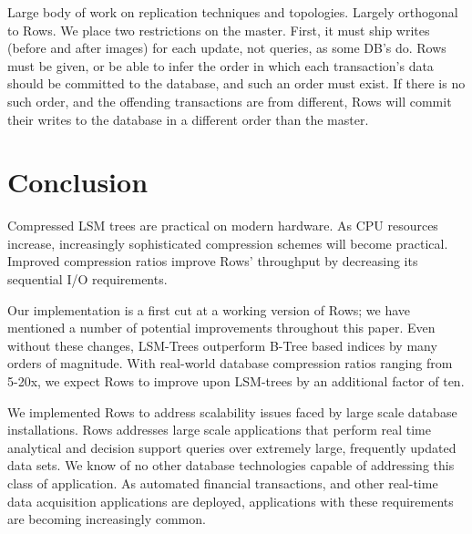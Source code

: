 \documentclass{sig-alternate-sigmod08}
\newcommand{\rows}{Rows\xspace}
\newcommand{\rowss}{Rows'\xspace}
\begin{document}
Large body of work on replication techniques and topologies.  Largely
orthogonal to \rows.  We place two restrictions on the master.  First,
it must ship writes (before and after images) for each update, not
queries, as some DB's do.  \rows must be given, or be able to infer
the order in which each transaction's data should be committed to the
database, and such an order must exist.  If there is no such order,
and the offending transactions are from different, \rows will commit
their writes to the database in a different order than the master.



\section{Conclusion}

Compressed LSM trees are practical on modern hardware.  As CPU
resources increase, increasingly sophisticated compression schemes
will become practical.  Improved compression ratios improve \rowss
throughput by decreasing its sequential I/O requirements.

Our implementation is a first cut at a working version of \rows; we
have mentioned a number of potential improvements throughout this
paper.  Even without these changes, LSM-Trees outperform B-Tree based
indices by many orders of magnitude.  With real-world database
compression ratios ranging from 5-20x, we expect \rows to improve upon
LSM-trees by an additional factor of ten.

We implemented \rows to address scalability issues faced by large
scale database installations.  \rows addresses large scale
applications that perform real time analytical and decision support
queries over extremely large, frequently updated data sets.  We know
of no other database technologies capable of addressing this class of
application.  As automated financial transactions, and other real-time
data acquisition applications are deployed, applications with these
requirements are becoming increasingly common.


%
%
\balancecolumns %
\end{document}
